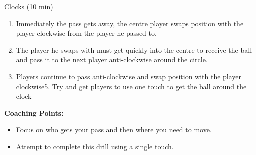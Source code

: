 \begin{evenBlock}{Clocks (10 min)}
\begin{minipage}[t]{\linewidth}
\begin{minipage}{.6\linewidth}
\begin{enumerate}
        \item Immediately the pass gets away, the centre player swaps position with the player clockwise from the player he passed to.
        \item The player he swaps with must get quickly into the centre to receive the ball and pass it to the next player anti-clockwise around the circle.
        \item Players continue to pass anti-clockwise and swap position with the player clockwise5. Try and get players to use one touch to get the ball around the clock
        \end{enumerate}
        
        \textbf{Coaching Points:}
        \begin{itemize}
        \setlength{\itemsep}{0pt}
        \setlength{\parskip}{0pt}
        \setlength{\parsep}{0pt}
        \item Focus on who gets your pass and then where you need to move.
        \item Attempt to complete this drill using a single touch.
        \end{itemize}

    \end{minipage}
\end{minipage}

\end{evenBlock}